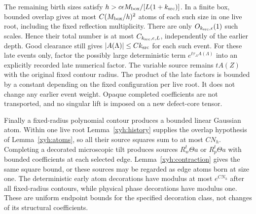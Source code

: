 The remaining birth sizes satisfy
$h>c\epsilon M_{\rm box}/[L(1+k_{\rm src})]$. In a finite box, bounded
overlap gives at most $C(M_{\rm box}/h)^2$ atoms of each such size in one
live root, including the fixed reflection multiplicity. There are only
$O_{k_{\rm src},\epsilon}(1)$ such scales. Hence their total number is
at most $C_{k_{\rm src},\epsilon,L}$, independently of the earlier depth.
Good clearance still gives $|A(\Lambda)|\le Ck_{\rm src}$ for each such
event. For these late events only, factor the possibly large deterministic term
$e^{t\tau_A A(\Lambda)}$ into an explicitly recorded late numerical
factor. The variable source remains $tA(Z)$ with the original fixed
contour radius. The product of the late factors is bounded by a constant
depending on the fixed configuration per live root. It does not change
any earlier event weight. Opaque completed coefficients are not
transported, and no singular lift is imposed on a new defect-core tensor.

Finally a fixed-radius polynomial contour produces a bounded linear
Gaussian atom. Within one live root Lemma~\ref{xyh:history} supplies the
overlap hypothesis of Lemma~\ref{xyh:atoms}, so all their source squares
sum to at most $CN_h$. Completing a decorated microscopic tilt produces
sources $R_w^t\Theta a$ or $R_p^t\Theta a$ with bounded coefficients at
each selected edge. Lemma~\ref{xyh:contraction} gives the same square
bound, or these sources may be regarded as edge atoms born at size one.
The deterministic early atom decorations have modulus at most
$e^{C N_h}$ after all fixed-radius contours, while physical phase
decorations have modulus one. These are uniform endpoint bounds for the
specified decoration class, not changes of its structural coefficients.

